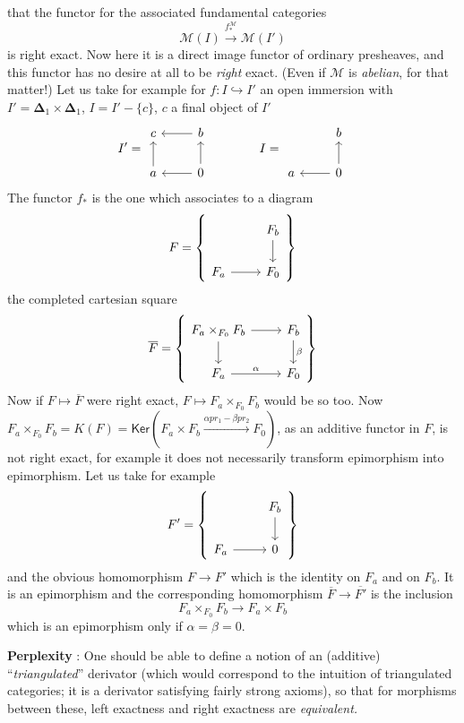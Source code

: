 \documentclass[11pt]{article}
\newcommand{\printedpage}[1]{\marginpar{\footnotesize p.~#1}}
\newcommand{\msp}[1]{\marginpar{\footnotesize [#1]}}
\begin{document}
\printedpage{19}
\msp{page 28}
that the functor for the associated fundamental categories
\[ \mathcal{M}(I) \xrightarrow{f^{\mathcal{M}}_*} \mathcal{M}(I') \]
is right exact. Now here it is a direct image functor of ordinary presheaves, and this functor has no desire at all to be \textit{right} exact. (Even if $\mathcal{M}$ is \textit{abelian}, for that matter!) Let us take for example for $f : I \hookrightarrow I'$ an open immersion with $I' = \boldsymbol{\Delta}_1 \times \boldsymbol{\Delta}_1$, $I = I' - \{c\}$, $c$ a final object of $I'$
\[
I' = \begin{tikzcd}
c & b \arrow[l] \\
a \arrow[u] & 0 \arrow[l] \arrow[u]
\end{tikzcd}
\qquad\qquad
I = \begin{tikzcd}
 & b \\
a & 0 \arrow[l] \arrow[u]
\end{tikzcd}
\]
The functor $f_*$ is the one which associates to a diagram
\[
F = \left\{
\begin{tikzcd}
 & F_b \arrow[d] \\
F_a \arrow[r] & F_0
\end{tikzcd}
\right\}
\]
the completed cartesian square
\[
\overline{F} = \left\{
\begin{tikzcd}
F_a \times_{F_0} F_b \arrow[r] \arrow[d] & F_b \arrow[d, "\beta"] \\
F_a \arrow[r, "\alpha"] & F_0
\end{tikzcd}
\right\}
\]
Now if $F \mapsto \overline{F}$ were right exact, $F \mapsto F_a \times_{F_0} F_b$ would be so too. Now $F_a \times_{F_0} F_b = K(F) = \mathsf{Ker}(F_a \times F_b \xrightarrow{\alpha pr_1 - \beta pr_2} F_0)$, as an additive functor in $F$, is not right exact, for example it does not necessarily transform epimorphism into epimorphism. Let us take for example
\[
F' = \left\{
\begin{tikzcd}
 & F_b \arrow[d] \\
F_a \arrow[r] & 0
\end{tikzcd}
\right\}
\]
and the obvious homomorphism $F \to F'$ which is the identity on
\msp{page 29}
$F_a$ and on $F_b$. It is an epimorphism and the corresponding homomorphism $\overline{F} \to \overline{F'}$ is the inclusion
\[ F_a \times_{F_0} F_b \longrightarrow F_a \times F_b \]
which is an epimorphism only if $\alpha = \beta = 0$.

\printedpage{20}
\textbf{Perplexity} : One should be able to define a notion of an (additive) ``\textit{triangulated}'' derivator (which would correspond to the intuition of triangulated categories; it is a derivator satisfying fairly strong axioms), so that for morphisms between these, left exactness and right exactness are \textit{equivalent.}
\end{document}
